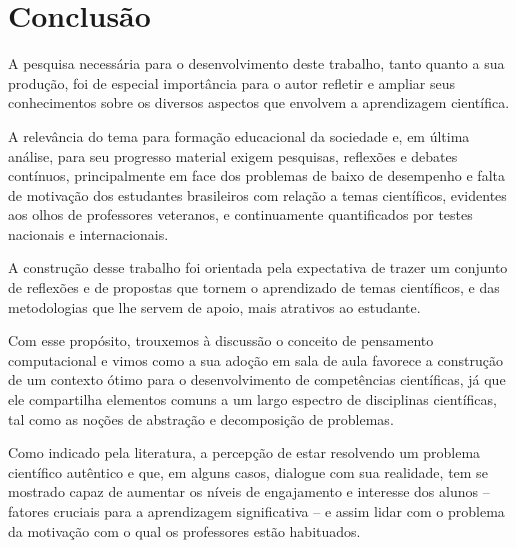 \chapter*[Conclusão]{Conclusão}

A pesquisa necessária para o desenvolvimento deste trabalho, tanto quanto a sua produção, foi de especial importância para o autor refletir e ampliar seus conhecimentos sobre os diversos aspectos que envolvem a aprendizagem científica. 

A relevância do tema para formação educacional da sociedade e, em última análise, para seu progresso material exigem pesquisas, reflexões e debates contínuos, principalmente em face dos problemas de baixo de desempenho e falta de motivação dos estudantes brasileiros com relação a temas científicos, evidentes aos olhos de professores veteranos, e continuamente quantificados por testes nacionais e internacionais. 

A construção desse trabalho foi orientada pela expectativa de trazer um conjunto de reflexões e de propostas que tornem o aprendizado de temas científicos, e das metodologias que lhe servem de apoio, mais atrativos ao estudante. 

Com esse propósito, trouxemos à discussão o conceito de pensamento computacional e vimos como a sua adoção em sala de aula favorece a construção de um contexto ótimo para o desenvolvimento de competências científicas, já que ele compartilha elementos comuns a um largo espectro de disciplinas científicas, tal como as noções de abstração e decomposição de problemas.

Como indicado pela literatura, a percepção de estar resolvendo um problema científico autêntico e que, em alguns casos, dialogue com sua realidade, tem se mostrado capaz de aumentar os níveis de engajamento e interesse dos alunos -- fatores cruciais para a aprendizagem significativa -- e assim lidar com o problema da motivação com o qual os professores estão habituados.









